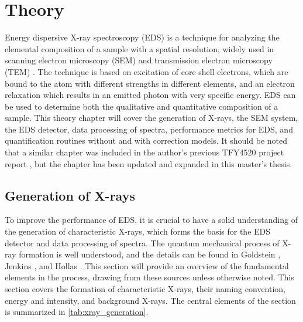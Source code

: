 \chapter{Theory}
\label{ch:theory}

Energy dispersive X-ray spectroscopy (EDS) is a technique for analyzing the elemental composition of a sample with a spatial resolution, widely used in scanning electron microscopy (SEM) and transmission electron microscopy (TEM) \cite{goldstein_scanning_2018,williams_carter_tem_2009}.
The technique is based on excitation of core shell electrons, which are bound to the atom with different strengths in different elements, and an electron relaxation which results in an emitted photon with very specific energy.
EDS can be used to determine both the qualitative and quantitative composition of a sample.
This theory chapter will cover the generation of X-rays, the SEM system, the EDS detector, data processing of spectra, performance metrics for EDS, and quantification routines without and with correction models.
It should be noted that a similar chapter was included in the author's previous TFY4520 project report \cite{project_report}, but the chapter has been updated and expanded in this master's thesis.



\section{Generation of X-rays}
\label{theory:xray_formation}

To improve the performance of EDS, it is crucial to have a solid understanding of the generation of characteristic X-rays, which forms the basis for the EDS detector and data processing of spectra.
The quantum mechanical process of X-ray formation is well understood, and the details can be found in Goldstein \cite[Ch. 4.2]{goldstein_scanning_2018}, Jenkins \cite{jenkins_xrayspectroscopy}, and Hollas \cite[Ch. 8.2]{hollas_modern_2004}.
This section will provide an overview of the fundamental elements in the process, drawing from these sources unless otherwise noted.
This section covers the formation of characteristic X-rays, their naming convention, energy and intensity, and background X-rays.
The central elements of the section is summarized in \cref{tab:xray_generation}.




